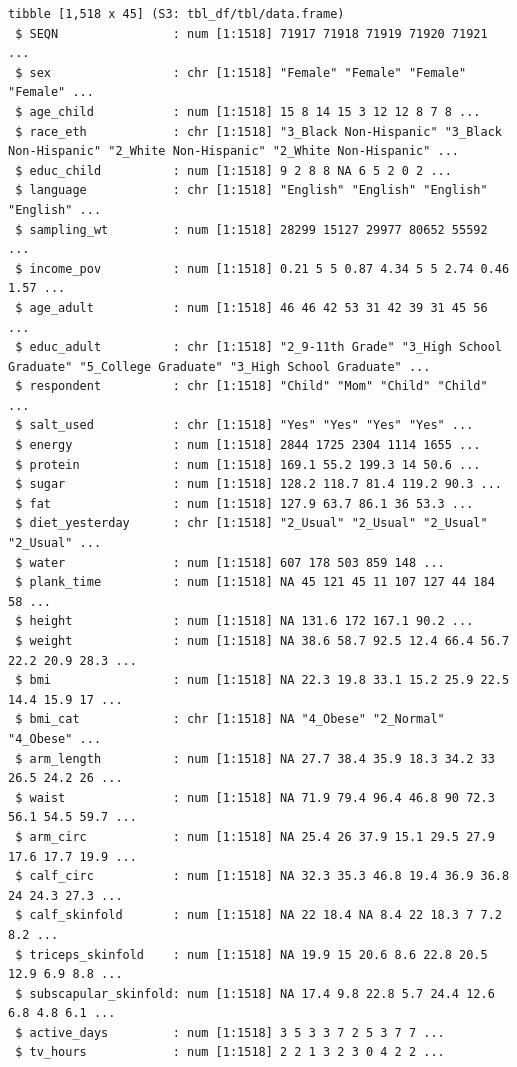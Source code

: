 \documentclass[
]{book}
\begin{document}
\begin{verbatim}
tibble [1,518 x 45] (S3: tbl_df/tbl/data.frame)
 $ SEQN                : num [1:1518] 71917 71918 71919 71920 71921 ...
 $ sex                 : chr [1:1518] "Female" "Female" "Female" "Female" ...
 $ age_child           : num [1:1518] 15 8 14 15 3 12 12 8 7 8 ...
 $ race_eth            : chr [1:1518] "3_Black Non-Hispanic" "3_Black Non-Hispanic" "2_White Non-Hispanic" "2_White Non-Hispanic" ...
 $ educ_child          : num [1:1518] 9 2 8 8 NA 6 5 2 0 2 ...
 $ language            : chr [1:1518] "English" "English" "English" "English" ...
 $ sampling_wt         : num [1:1518] 28299 15127 29977 80652 55592 ...
 $ income_pov          : num [1:1518] 0.21 5 5 0.87 4.34 5 5 2.74 0.46 1.57 ...
 $ age_adult           : num [1:1518] 46 46 42 53 31 42 39 31 45 56 ...
 $ educ_adult          : chr [1:1518] "2_9-11th Grade" "3_High School Graduate" "5_College Graduate" "3_High School Graduate" ...
 $ respondent          : chr [1:1518] "Child" "Mom" "Child" "Child" ...
 $ salt_used           : chr [1:1518] "Yes" "Yes" "Yes" "Yes" ...
 $ energy              : num [1:1518] 2844 1725 2304 1114 1655 ...
 $ protein             : num [1:1518] 169.1 55.2 199.3 14 50.6 ...
 $ sugar               : num [1:1518] 128.2 118.7 81.4 119.2 90.3 ...
 $ fat                 : num [1:1518] 127.9 63.7 86.1 36 53.3 ...
 $ diet_yesterday      : chr [1:1518] "2_Usual" "2_Usual" "2_Usual" "2_Usual" ...
 $ water               : num [1:1518] 607 178 503 859 148 ...
 $ plank_time          : num [1:1518] NA 45 121 45 11 107 127 44 184 58 ...
 $ height              : num [1:1518] NA 131.6 172 167.1 90.2 ...
 $ weight              : num [1:1518] NA 38.6 58.7 92.5 12.4 66.4 56.7 22.2 20.9 28.3 ...
 $ bmi                 : num [1:1518] NA 22.3 19.8 33.1 15.2 25.9 22.5 14.4 15.9 17 ...
 $ bmi_cat             : chr [1:1518] NA "4_Obese" "2_Normal" "4_Obese" ...
 $ arm_length          : num [1:1518] NA 27.7 38.4 35.9 18.3 34.2 33 26.5 24.2 26 ...
 $ waist               : num [1:1518] NA 71.9 79.4 96.4 46.8 90 72.3 56.1 54.5 59.7 ...
 $ arm_circ            : num [1:1518] NA 25.4 26 37.9 15.1 29.5 27.9 17.6 17.7 19.9 ...
 $ calf_circ           : num [1:1518] NA 32.3 35.3 46.8 19.4 36.9 36.8 24 24.3 27.3 ...
 $ calf_skinfold       : num [1:1518] NA 22 18.4 NA 8.4 22 18.3 7 7.2 8.2 ...
 $ triceps_skinfold    : num [1:1518] NA 19.9 15 20.6 8.6 22.8 20.5 12.9 6.9 8.8 ...
 $ subscapular_skinfold: num [1:1518] NA 17.4 9.8 22.8 5.7 24.4 12.6 6.8 4.8 6.1 ...
 $ active_days         : num [1:1518] 3 5 3 3 7 2 5 3 7 7 ...
 $ tv_hours            : num [1:1518] 2 2 1 3 2 3 0 4 2 2 ...

\end{verbatim}
\end{document}
